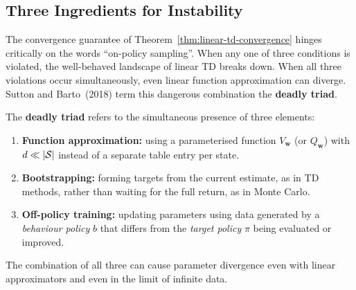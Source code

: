 \subsection{Three Ingredients for Instability}

The convergence guarantee of Theorem~\ref{thm:linear-td-convergence} hinges critically on the
words ``on-policy sampling''.  When any one of three conditions is violated, the well-behaved
landscape of linear TD breaks down.  When all three violations occur simultaneously, even linear
function approximation can diverge.  Sutton and Barto~(2018) term this dangerous combination the
\textbf{deadly triad}.

\begin{definition}
\label{def:deadly-triad}
The \textbf{deadly triad} refers to the simultaneous presence of three elements:
\begin{enumerate}
\item \textbf{Function approximation:} using a parameterised function
  $V_\mathbf{w}$ (or $Q_\mathbf{w}$) with $d \ll |\mathcal{S}|$ instead of a separate table entry per
  state.
\item \textbf{Bootstrapping:} forming targets from the current estimate, as in TD methods, rather
  than waiting for the full return, as in Monte Carlo.
\item \textbf{Off-policy training:} updating parameters using data generated by a \emph{behaviour
  policy} $b$ that differs from the \emph{target policy} $\pi$ being evaluated or improved.
\end{enumerate}
The combination of all three can cause parameter divergence even with linear approximators and
even in the limit of infinite data.
\end{definition}

